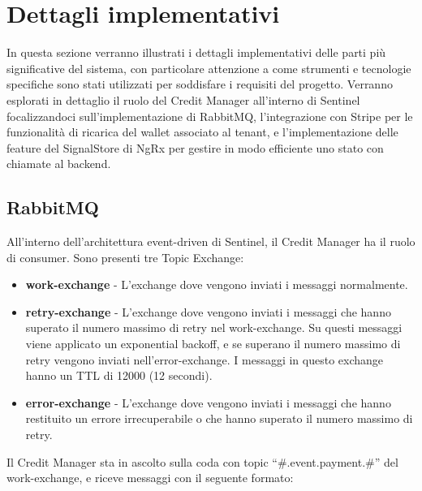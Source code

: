 \chapter{Dettagli implementativi}
In questa sezione verranno illustrati i dettagli implementativi delle parti pi\`u significative del sistema, con particolare attenzione a come strumenti
e tecnologie specifiche sono stati utilizzati per soddisfare i requisiti del progetto. Verranno esplorati in dettaglio il ruolo del Credit Manager all'interno di Sentinel
focalizzandoci sull'implementazione di RabbitMQ, l'integrazione con Stripe per le funzionalità di ricarica del wallet associato al tenant, e l'implementazione delle feature del
SignalStore di NgRx per gestire in modo efficiente uno stato con chiamate al backend.

\section{RabbitMQ}
All'interno dell'architettura event-driven di Sentinel, il Credit Manager ha il ruolo di consumer.
Sono presenti tre Topic Exchange:
\begin{itemize}
  \item \textbf{work-exchange} - L'exchange dove vengono inviati i messaggi normalmente.
  \item \textbf{retry-exchange} - L'exchange dove vengono inviati i messaggi che hanno superato il numero massimo di retry nel work-exchange.
    Su questi messaggi viene applicato un exponential backoff, e se superano il numero massimo di retry vengono inviati nell'error-exchange. I messaggi in questo
    exchange hanno un TTL di 12000 (12 secondi).
  \item \textbf{error-exchange} - L'exchange dove vengono inviati i messaggi che hanno restituito un errore irrecuperabile o che hanno superato il numero massimo di retry.
\end{itemize}

Il Credit Manager sta in ascolto sulla coda con topic ``\#.event.payment.\#'' del work-exchange, e riceve messaggi con il seguente formato:

